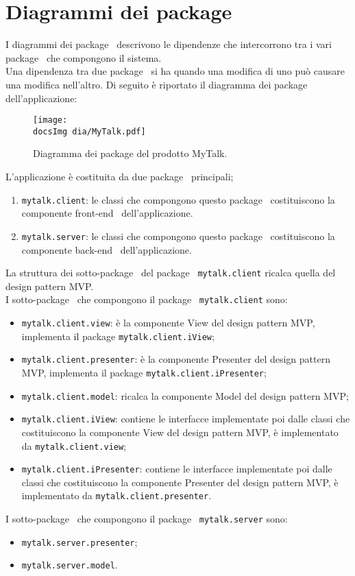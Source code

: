 \section{Diagrammi dei package}
I diagrammi dei package\g~ descrivono le dipendenze che intercorrono tra i vari package\g~ che compongono il sistema.\\
Una dipendenza tra due package\g~ si ha quando una modifica di uno può causare una modifica nell'altro.
Di seguito è riportato il diagramma dei package\g~ dell'applicazione:
	
	\begin{figure}[h!tbp]
		\centering
		\texttt{[image: \\docsImg dia/MyTalk.pdf]}
		\caption{Diagramma dei package del prodotto MyTalk.}
	\end{figure}

L'applicazione è costituita da due package\g~ principali;
\begin{enumerate}
	\item \texttt{mytalk.client}: le classi che compongono questo package\g~ costituiscono la componente front-end\g~ dell'applicazione.
	\item \texttt{mytalk.server}: le classi che compongono questo package\g~ costituiscono la componente back-end\g~ dell'applicazione.
\end{enumerate}
La struttura dei sotto-package\g~ del package\g~ \texttt{mytalk.client} ricalca quella del design pattern MVP.\\
I sotto-package\g~ che compongono il package\g~ \texttt{mytalk.client} sono:
\begin{itemize}
	\item \texttt{mytalk.client.view}: è la componente View del design pattern MVP, implementa il package \texttt{mytalk.client.iView};
	\item \texttt{mytalk.client.presenter}: è la componente Presenter del design pattern MVP, implementa il package \texttt{mytalk.client.iPresenter};
	\item \texttt{mytalk.client.model}: ricalca la componente Model del design pattern MVP;
	\item \texttt{mytalk.client.iView}: contiene le interfacce implementate poi dalle classi che costituiscono la componente View del design pattern MVP, è implementato da \texttt{mytalk.client.view};
	\item \texttt{mytalk.client.iPresenter}: contiene le interfacce implementate poi dalle classi che costituiscono la componente Presenter del design pattern MVP, è implementato da \texttt{mytalk.client.presenter}.
\end{itemize}
I sotto-package\g~ che compongono il package\g~ \texttt{mytalk.server} sono:
\begin{itemize}
	\item \texttt{mytalk.server.presenter};
	\item \texttt{mytalk.server.model}.
\end{itemize}


